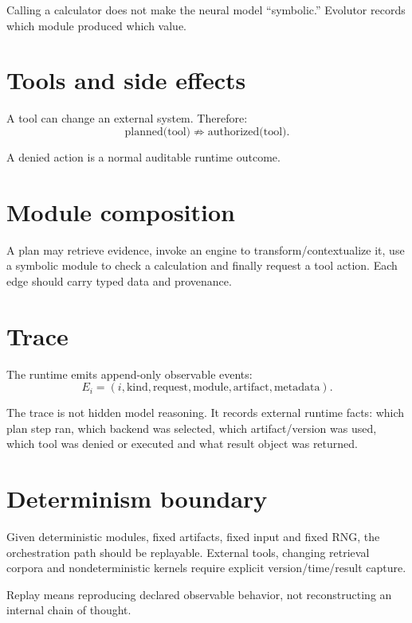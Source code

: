 Calling a calculator does not make the neural model ``symbolic.'' Evolutor records which module produced which value.

\section{Tools and side effects}
A tool can change an external system. Therefore:
\[
\text{planned(tool)}\not\Rightarrow\text{authorized(tool)}.
\]

A denied action is a normal auditable runtime outcome.

\section{Module composition}
A plan may retrieve evidence, invoke an engine to transform/contextualize it, use a symbolic module to check a calculation and finally request a tool action. Each edge should carry typed data and provenance.

\section{Trace}
The runtime emits append-only observable events:
\[
E_i=(i,\text{kind},\text{request},\text{module},\text{artifact},\text{metadata}).
\]

The trace is not hidden model reasoning. It records external runtime facts: which plan step ran, which backend was selected, which artifact/version was used, which tool was denied or executed and what result object was returned.

\section{Determinism boundary}
Given deterministic modules, fixed artifacts, fixed input and fixed RNG, the orchestration path should be replayable. External tools, changing retrieval corpora and nondeterministic kernels require explicit version/time/result capture.

Replay means reproducing declared observable behavior, not reconstructing an internal chain of thought.

